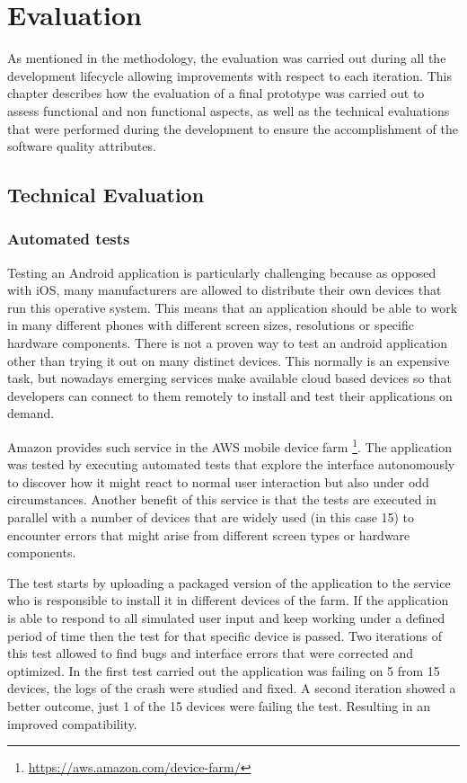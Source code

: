 \chapter{Evaluation}
As mentioned in the methodology, the evaluation was carried out during all the development lifecycle allowing improvements with respect to each iteration. This chapter describes how the evaluation of a final prototype was carried out to assess functional and non functional aspects, as well as the technical evaluations that were performed during the development to ensure the accomplishment of the software quality attributes. 

\section{Technical Evaluation}

\subsection{Automated tests}

Testing an Android application is particularly challenging because as opposed with iOS, many manufacturers are allowed to distribute their own devices that run this operative system. This means that an application should be able to work in many different phones with different screen sizes, resolutions or specific hardware components. There is not a proven way to test an android application other than trying it out on many distinct devices. This normally is an expensive task, but nowadays emerging services make available cloud based devices so that developers can connect to them remotely to install and test their applications on demand.

Amazon provides such service in the AWS mobile device farm \footnote{\url{https://aws.amazon.com/device-farm/}}. The application was tested by executing automated tests that explore the interface autonomously to discover how it might react to normal user interaction but also under odd circumstances. Another benefit of this service is that the tests are executed in parallel with a number of devices that are widely used (in this case 15) to encounter errors that might arise from different screen types or hardware components. 

The test starts by uploading a packaged version of the application to the service who is responsible to install it in different devices of the farm. If the application is able to respond to all simulated user input and keep working under a defined period of time then the test for that specific device is passed. Two iterations of this test allowed to find bugs and interface errors that were corrected and optimized. In the first test carried out the application was failing on 5 from 15 devices, the logs of the crash were studied and fixed. A second iteration showed a better outcome, just 1 of the 15 devices were failing the test. Resulting in an improved compatibility.   

